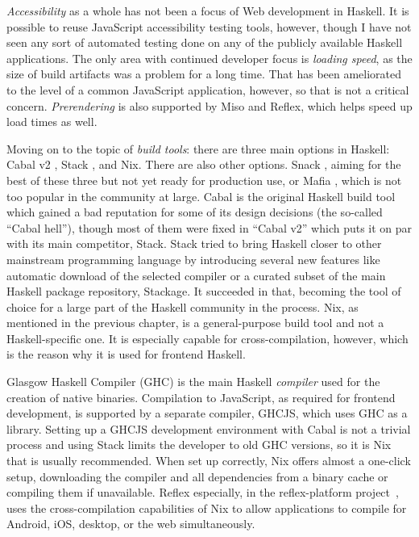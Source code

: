 \documentclass[english,odsaz]{fitthesis}
\begin{document}
\emph{Accessibility} as a whole has not been a focus of Web development in Haskell. It
is possible to reuse JavaScript accessibility testing tools, however, though I
have not seen any sort of automated testing done on any of the publicly
available Haskell applications. The only area with continued developer focus is
\emph{loading speed}, as the size of build artifacts was a problem for a long
time. That has been ameliorated to the level of a common JavaScript application,
however, so that is not a critical concern. \emph{Prerendering} is also supported by
Miso and Reflex, which helps speed up load times as well.

Moving on to the topic of \emph{build tools}: there are three main options in Haskell:
Cabal v2 \cite{cabal}, Stack \cite{stack}, and Nix. There are also other options.
Snack \cite{snack}, aiming for the best of these three but not yet ready for
production use, or Mafia \cite{mafia}, which is not too popular in the community
at large. Cabal is the original Haskell build tool which gained a bad reputation
for some of its design decisions (the so-called ``Cabal hell''), though most of
them were fixed in ``Cabal v2'' which puts it on par with its main competitor,
Stack. Stack tried to bring Haskell closer to other mainstream programming
language by introducing several new features like automatic download of the
selected compiler or a curated subset of the main Haskell package repository,
Stackage. It succeeded in that, becoming the tool of choice for a large part of
the Haskell community in the process. Nix, as mentioned in the previous chapter,
is a general-purpose build tool and not a Haskell-specific one. It is especially
capable for cross-compilation, however, which is the reason why it is used for
frontend Haskell.

Glasgow Haskell Compiler (GHC) is the main Haskell \emph{compiler} used for the
creation of native binaries. Compilation to JavaScript, as required for frontend
development, is supported by a separate compiler, GHCJS, which uses GHC as a
library. Setting up a GHCJS development environment with Cabal is not a trivial
process and using Stack limits the developer to old GHC versions, so it is Nix
that is usually recommended. When set up correctly, Nix offers almost a
one-click setup, downloading the compiler and all dependencies from a binary
cache or compiling them if unavailable. Reflex especially, in the
reflex-platform project~\cite{reflex-platform}, uses the cross-compilation
capabilities of Nix to allow applications to compile for Android, iOS, desktop,
or the web simultaneously.
\end{document}
